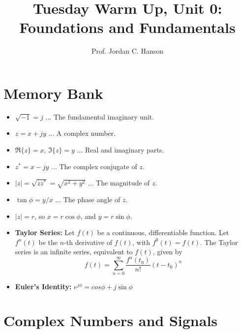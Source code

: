 \documentclass{article}
\begin{document}
\twocolumn

\title{Tuesday Warm Up, Unit 0: Foundations and Fundamentals}
\author{Prof. Jordan C. Hanson}

\maketitle

\section{Memory Bank}

\begin{itemize}
\item $\sqrt{-1} = j$ ... The fundamental imaginary unit.
\item $z = x + jy$ ... A complex number.
\item $\Re \lbrace z \rbrace = x$, $\Im \lbrace z \rbrace = y$ ... Real and imaginary parts.
\item $z^{*} = x - j y$ ... The complex conjugate of $z$.
\item $|z| = \sqrt{z z^{*}} = \sqrt{x^2 + y^2}$ ... The magnitude of $z$.
\item $\tan\phi = y/x$ ... The phase angle of $z$.
\item $|z| = r$, so $x = r\cos\phi$, and $y = r\sin\phi$.
\item \textbf{Taylor Series:} Let $f(t)$ be a continuous, differentiable function.  Let $f^n(t)$ be the $n$-th derivative of $f(t)$, with $f^0(t) = f(t)$. The Taylor series is an infinite series, equivalent to $f(t)$, given by
\begin{equation}
f(t) = \sum_{n=0}^{\infty} \frac{f^n(t_0)}{n!} (t-t_0)^n
\end{equation}
\item \textbf{Euler's Identity:} $e^{j\phi} = cos\phi + j\sin\phi$
\end{itemize}
\normalsize

\section{Complex Numbers and Signals}
\end{document}
